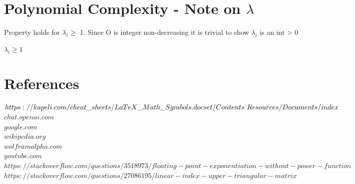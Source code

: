 \documentclass[11pt]{article}
\begin{document}
\section{Polynomial Complexity - Note on $\lambda$}
Property holds for $\lambda_i \geq$ 1. Since O is integer non-decreasing it is trivial to show $\lambda_i$ is an int > 0 
\begin{center}
$
\lambda_i \geq 1
$
\end{center}


\newpage
\section*{References}
\rbrack \hspace{1mm} $https://kapeli.com/cheat\_sheets/LaTeX\_Math\_Symbols.docset/Contents\\\
Resources/Documents/index$\\
\rbrack \hspace{1mm} $chat.openai.com$\\
\rbrack \hspace{1mm} $google.com$\\
\rbrack \hspace{1mm} $wikipedia.org$\\
\lbrack3\rbrack \hspace{1mm} $wolframalpha.com$\\
\lbrack4\rbrack \hspace{1mm} $youtube.com$\\
\rbrack \hspace{1mm} $https://stackoverflow.com/questions/3518973/floating-point-exponentiation-without-power-function$\\
\lbrack6\rbrack \hspace{1mm} $https://stackoverflow.com/questions/27086195/linear-index-upper-triangular-matrix$\\
\end{document}
